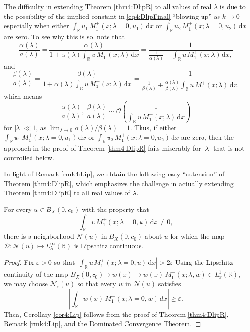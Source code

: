 \documentclass[../dissertation.tex]{subfiles}
\begin{document}
\begin{rmk}\label{rmk4:Lip}
	The difficulty in extending Theorem \ref{thm4:DlipR} to all values of real 
	$\lambda$ is due to the possibility of the implied constant in 
	\eqref{eq4:DlipFinal} ``blowing-up'' as $k\to 0$\textemdash{}especially when 
	either $\int_{\mathbb R} u_1 \, M_1^+(x; \lambda = 0, u_1) \, \mathrm{d}x$ or 
	$\int_{\mathbb R} u_2 \, M_1^+(x; \lambda = 0, u_2) \, \mathrm{d}x$ are zero. To see 
	why this is so, note that 
	\[
		\frac{\alpha(\lambda)}{a(\lambda)}
			= \frac{\alpha(\lambda)}
				{
					1 
						+ \alpha(\lambda) 
							\int_{\mathbb R} 
								u \, M_1^+(x; \lambda) 
							\, \mathrm{d}x
				}
			=\frac{1}
				{
					\frac{1}{\alpha(\lambda)} 
						+ \int_{\mathbb R} u \, M_1^+(x; \lambda) \, \mathrm{d}x,
				}
	\]
	and
	\[
		\frac{\beta(\lambda)}{a(\lambda)}
			= \frac{\beta(\lambda)}
				{
					1 
						+ \alpha(\lambda) 
							\int_{\mathbb R} 
								u \, M_1^+(x; \lambda) 
							\, \mathrm{d}x
				}
			=\frac{1}
				{
					\frac{1}{\beta(\lambda)} 
						+ \frac{\alpha(\lambda)}{\beta(\lambda)}
							\int_{\mathbb R} 
								u \, M_1^+(x; \lambda) 
							\, \mathrm{d}x.
				}
	\]
	which means 
	\[
		\frac{\alpha(\lambda)}{a(\lambda)},~\frac{\beta(\lambda)}{a(\lambda)}
			\sim \mathcal O
				\left(
					\frac{1}
						{
							\int_{\mathbb R} 
								u \, M_1^+(x; \lambda) 
							\, \mathrm{d}x
						}
				\right)
	\]
	for $|\lambda| \ll 1$, as 
	$\lim_{\lambda\to0} \alpha(\lambda) / \beta(\lambda) = 1$.
	Thus, if either $\int_{\mathbb R} u_1 \, M_1^+(x; \lambda = 0, u_1) \, \mathrm{d}x$ or 
	$\int_{\mathbb R} u_2 \, M_1^+(x; \lambda = 0, u_2) \, \mathrm{d}x$ are zero, then the 
	approach in the proof of Theorem \ref{thm4:DlipR} fails miserably for 
	$|\lambda|$ that is not controlled below.
\end{rmk}

In light of Remark \ref{rmk4:Lip}, we obtain the following easy ``extension''
of Theorem \ref{thm4:DlipR}, which emphasizes the challenge in actually extending
Theorem \ref{thm4:DlipR} to all real values of $\lambda$. 

\begin{cor}\label{cor4:Lip}
	For every $u \in B_X(0, c_0)$ with the property that
	\[
		\int_{\mathbb R} u\,M_1^+(x; \lambda = 0, u) \, \mathrm{d}x \ne 0,
	\]
	there is a neighborhood $\mathcal N(u)$ in $B_X(0, c_0)$ about $u$ 
	for which the map $\mathscr D : \mathcal N(u) \mapsto 
	L_\lambda^\infty(\mathbb R)$ is Lipschitz continuous. 
\end{cor}
\begin{proof}
	Fix $\varepsilon > 0$ so that 
	$\left| \int_{\mathbb R} u\,M_1^+(x; \lambda = 0, u) \, \mathrm{d}x \right| > 2\varepsilon$
	Using the Lipschitz continuity of the map 
	$B_X(0, c_0) \ni w(x) \to  w(x)\, M_1^+(x; \lambda, w)
	\in L_x^1(\mathbb R)$, we may choose $\mathcal N_\varepsilon(u)$ so that 
	every $w$ in $\mathcal N(u)$ satisfies 
	\[
		\left| \int_{\mathbb R} w(x)\, M_1^+(x; \lambda=0, w)\,dx \right|
			\geq \varepsilon.
	\]
	Then, Corollary \ref{cor4:Lip} follows from the proof of Theorem 
	\ref{thm4:DlipR}, Remark \ref{rmk4:Lip}, and the Dominated Convergence
	Theorem.
\end{proof}
\end{document}
